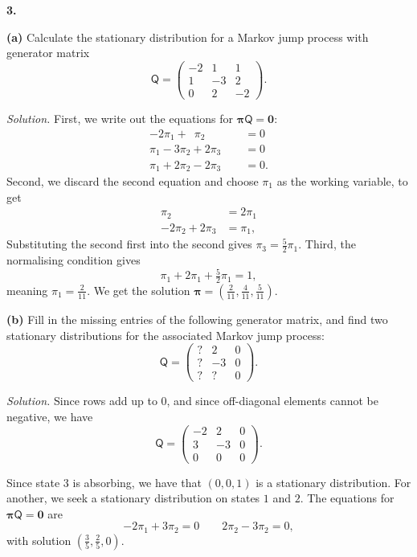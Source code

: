 \documentclass[
  a4paper,
]{article}
\theoremstyle{definition}
\theoremstyle{definition}
\theoremstyle{definition}
\theoremstyle{remark}
\begin{document}
\textbf{3.}

\textbf{(a)} Calculate the stationary distribution for a Markov jump process with generator matrix
\[ \mathsf Q = \begin{pmatrix} -2 & 1 & 1 \\ 1 & -3 & 2 \\ 0 & 2 & -2 \end{pmatrix}.   \]

\begin{myanswers}
\emph{Solution.}
First, we write out the equations for \(\boldsymbol\pi \mathsf Q = \mathbf 0\):
\begin{align*}
-2 \pi_1 + \phantom{3}\pi_2 \phantom{{}+2\pi_3} &= 0 \\
\pi_1 - 3\pi_2 + 2\pi_3 &= 0 \\
\pi_1 + 2\pi_2 - 2\pi_3 &= 0 .
\end{align*}
Second, we discard the second equation and choose \(\pi_1\) as the working variable, to get
\begin{align*}
\pi_2 \phantom{{}+2\pi_3 }&= 2\pi_1 \\
-2\pi_2 + 2\pi_3 &= \pi_1 ,
\end{align*}
Substituting the second first into the second gives \(\pi_3 = \frac{5}{2}\pi_1\).
Third, the normalising condition gives
\[ \pi_1 + 2\pi_1 + \tfrac52 \pi_1 = 1  , \]
meaning \(\pi_1 = \frac{2}{11}\). We get the solution \(\boldsymbol\pi = (\frac{2}{11}, \frac{4}{11}, \frac{5}{11})\).

\end{myanswers}

\textbf{(b)} Fill in the missing entries of the following generator matrix, and find two stationary distributions for the associated Markov jump process:
\[ \mathsf Q = \begin{pmatrix} ? & 2 & 0 \\ ? & -3 & 0 \\ ? & ? & 0 \end{pmatrix}.   \]

\begin{myanswers}
\emph{Solution.}
Since rows add up to \(0\), and since off-diagonal elements cannot be negative, we have
\[ \mathsf Q = \begin{pmatrix} -2 & 2 & 0 \\ 3 & -3 & 0 \\ 0 & 0 & 0 \end{pmatrix}.   \]

Since state \(3\) is absorbing, we have that \((0,0,1)\) is a stationary distribution. For another, we seek a stationary distribution on states \(1\) and \(2\). The equations for \(\boldsymbol\pi \mathsf Q = \mathbf 0\) are
\[ -2\pi_1 + 3 \pi_2 = 0 \qquad 2\pi_2 - 3 \pi_2 = 0 , \]
with solution \((\frac35, \frac25, 0)\).

\end{myanswers}
\end{document}
